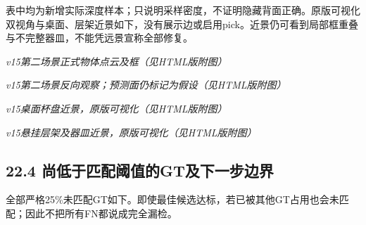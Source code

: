 \documentclass[UTF8,fontset=fandol]{ctexart}
\begin{document}
表中均为新增实际深度样本；只说明采样密度，不证明隐藏背面正确。原版可视化双视角与桌面、层架近景如下，没有展示边或启用pick。近景仍可看到局部框重叠与不完整器皿，不能凭远景宣称全部修复。



\textit{v15第二场景正式物体点云及框（见HTML版附图）}



\textit{v15第二场景反向观察；预测面仍标记为假设（见HTML版附图）}



\textit{v15桌面杯盘近景，原版可视化（见HTML版附图）}



\textit{v15悬挂层架及器皿近景，原版可视化（见HTML版附图）}



\subsection*{22.4 尚低于匹配阈值的GT及下一步边界}

全部严格25\%未匹配GT如下。即使最佳候选达标，若已被其他GT占用也会未匹配；因此不把所有FN都说成完全漏检。
\end{document}
